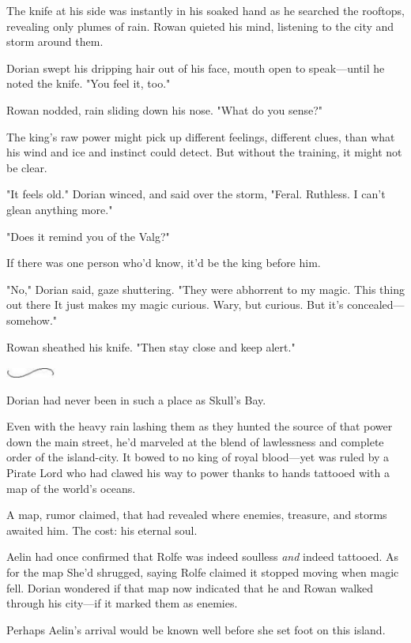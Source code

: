 The knife at his side was instantly in his soaked hand as he searched the rooftops, revealing only plumes of rain. Rowan quieted his mind, listening to the city and storm around them.

Dorian swept his dripping hair out of his face, mouth open to speak---until he noted the knife. "You feel it, too."

Rowan nodded, rain sliding down his nose. "What do you sense?"

The king's raw power might pick up different feelings, different clues, than what his wind and ice and instinct could detect. But without the training, it might not be clear.

"It feels  old." Dorian winced, and said over the storm, "Feral. Ruthless. I can't glean anything more."

"Does it remind you of the Valg?"

If there was one person who'd know, it'd be the king before him.

"No," Dorian said, gaze shuttering. "They were abhorrent to my magic. This thing out there  It just makes my magic curious. Wary, but curious. But it's concealed---somehow."

Rowan sheathed his knife. "Then stay close and keep alert."

\includegraphics[width=0.65in,height=0.13in]{images/seperator}

Dorian had never been in such a place as Skull's Bay.

Even with the heavy rain lashing them as they hunted the source of that power down the main street, he'd marveled at the blend of lawlessness and complete order of the island-city. It bowed to no king of royal blood---yet was ruled by a Pirate Lord who had clawed his way to power thanks to hands tattooed with a map of the world's oceans.

A map, rumor claimed, that had revealed where enemies, treasure, and storms awaited him. The cost: his eternal soul.

Aelin had once confirmed that Rolfe was indeed soulless \emph{and}
indeed tattooed. As for the map  She'd shrugged, saying Rolfe claimed it stopped moving when magic fell. Dorian wondered if that map now indicated that he and Rowan walked through his city---if it marked them as enemies.

Perhaps Aelin's arrival would be known well before she set foot on this island.

